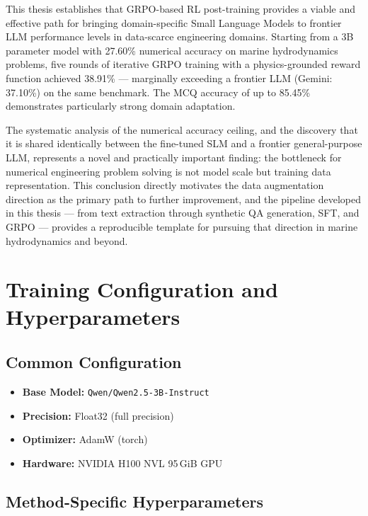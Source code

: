\documentclass[12pt]{report}
\begin{document}
This thesis establishes that GRPO-based RL post-training provides a viable and effective path for bringing domain-specific Small Language Models to frontier LLM performance levels in data-scarce engineering domains. Starting from a 3B parameter model with 27.60\% numerical accuracy on marine hydrodynamics problems, five rounds of iterative GRPO training with a physics-grounded reward function achieved 38.91\% --- marginally exceeding a frontier LLM (Gemini: 37.10\%) on the same benchmark. The MCQ accuracy of up to 85.45\% demonstrates particularly strong domain adaptation.

The systematic analysis of the numerical accuracy ceiling, and the discovery that it is shared identically between the fine-tuned SLM and a frontier general-purpose LLM, represents a novel and practically important finding: the bottleneck for numerical engineering problem solving is not model scale but training data representation. This conclusion directly motivates the data augmentation direction as the primary path to further improvement, and the pipeline developed in this thesis --- from text extraction through synthetic QA generation, SFT, and GRPO --- provides a reproducible template for pursuing that direction in marine hydrodynamics and beyond.


\appendix

\chapter{Training Configuration and Hyperparameters}

\section{Common Configuration}
\begin{itemize}
    \item \textbf{Base Model:} \texttt{Qwen/Qwen2.5-3B-Instruct}
    \item \textbf{Precision:} Float32 (full precision)
    \item \textbf{Optimizer:} AdamW (torch)
    \item \textbf{Hardware:} NVIDIA H100 NVL 95\,GiB GPU
\end{itemize}

\section{Method-Specific Hyperparameters}
\end{document}
